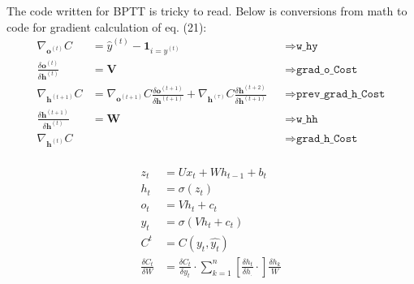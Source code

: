 \documentclass[12pt]{article}
\begin{document}
The code written for BPTT is tricky to read. Below is conversions from math to code for gradient calculation of eq. (21):
\begin{align*}
    \nabla_{\mathbf{o}^{(t)}} C &= \hat{y}^{(t)} - \mathbf{1}_{i=y^{(t)}} &&\Rightarrow \texttt{w\_hy} \\
    \frac{\delta \mathbf{o}^{(t)}}{\delta \mathbf{h}^{(t)}} &= \mathbf{V} &&\Rightarrow \texttt{grad\_o\_Cost} \\
    \nabla_{\mathbf{h}^{(t+1)}} C &= \nabla_{\mathbf{o}^{(t+1)}}C \frac{\delta \mathbf{o}^{(t+1)}}{\delta \mathbf{h}^{(t+1)}} + \nabla_{\mathbf{h}^{(\tau)}}C \frac{\delta \mathbf{h}^{(t+2)}}{\delta \mathbf{h}^{(t+1)}} &&\Rightarrow \texttt{prev\_grad\_h\_Cost} \\
    \frac{\delta \mathbf{h}^{(t+1)}}{\delta \mathbf{h}^{(t)}} &= \mathbf{W} &&\Rightarrow \texttt{w\_hh} \\
    \nabla_{\mathbf{h}^{(t)}} C &&&\Rightarrow \texttt{grad\_h\_Cost} \\
\end{align*}

\begin{align*}
    z_t &= Ux_t + Wh_{t-1} + b_t \\
    h_t &=  \sigma(z_t) \\
    o_t &=  Vh_t + c_t \\
    y_t &=  \sigma(Vh_t + c_t) \\
    C^t &= C(y_t,\hat{y_t}) \\
    \frac{\delta C_t}{\delta W} &= \frac{\delta C_t}{\delta y_t}
    \cdot \sum^n_{k=1}\left[\frac{\delta h_t}{\delta h_.}\cdot\right] \frac{\delta h_k}{W}
\end{align*}


\printbibliography
\end{document}
